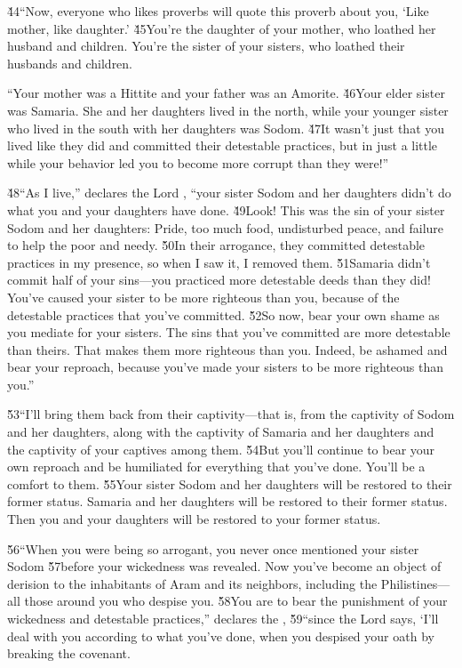 \v{44}``Now, everyone who likes proverbs will quote this proverb about you, `Like mother, like daughter.' \v{45}You're the daughter of your mother, who loathed her husband and children. You're the sister of your sisters, who loathed their husbands and children.

``Your mother was a Hittite and your father was an Amorite. \v{46}Your elder sister was Samaria. She and her daughters lived in the north, while your younger sister who lived in the south with her daughters was Sodom. \v{47}It wasn't just that you lived like they did and committed their detestable practices, but in just a little while your behavior led you to become more corrupt than they were!''

\v{48}``As I live,'' declares the Lord , ``your sister Sodom and her daughters didn't do what you and your daughters have done. \v{49}Look! This was the sin of your sister Sodom and her daughters: Pride, too much food, undisturbed peace, and failure to help the poor and needy. \v{50}In their arrogance, they committed detestable practices in my presence, so when I saw it, I removed them. \v{51}Samaria didn't commit half of your sins---you practiced more detestable deeds than they did! You've caused your sister to be more righteous than you, because of the detestable practices that you've committed. \v{52}So now, bear your own shame as you mediate for your sisters. The sins that you've committed are more detestable than theirs. That makes them more righteous than you. Indeed, be ashamed and bear your reproach, because you've made your sisters to be more righteous than you.''

\v{53}``I'll bring them back from their captivity---that is, from the captivity of Sodom and her daughters, along with the captivity of Samaria and her daughters and the captivity of your captives among them. \v{54}But you'll continue to bear your own reproach and be humiliated for everything that you've done. You'll be a comfort to them. \v{55}Your sister Sodom and her daughters will be restored to their former status. Samaria and her daughters will be restored to their former status. Then you and your daughters will be restored to your former status.

\v{56}``When you were being so arrogant, you never once mentioned your sister Sodom \v{57}before your wickedness was revealed. Now you've become an object of derision to the inhabitants of Aram and its neighbors, including the Philistines---all those around you who despise you. \v{58}You are to bear the punishment of your wickedness and detestable practices,'' declares the , \v{59}``since the Lord  says, `I'll deal with you according to what you've done, when you despised your oath by breaking the covenant.

